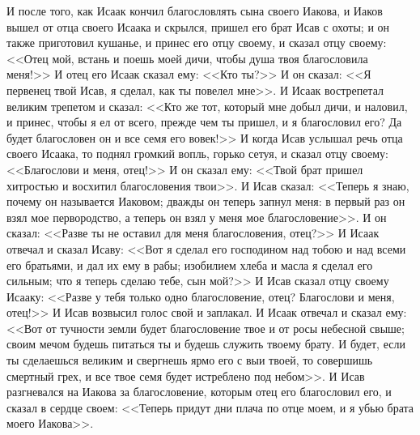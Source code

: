 И после того, как Исаак кончил благословлять
сына своего Иакова, и Иаков вышел от отца своего
Исаака и скрылся, пришел его брат Исав с охоты; и
он также приготовил кушанье, и принес его отцу
своему, и сказал отцу своему: <<Отец мой, встань
и поешь моей дичи, чтобы душа твоя благословила
меня!>> И отец его Исаак сказал ему: <<Кто
ты?>> И он сказал: <<Я первенец твой Исав, я
сделал, как ты повелел мне>>. И Исаак
вострепетал великим трепетом и сказал: <<Кто же
тот, который мне добыл дичи, и наловил, и принес,
чтобы я ел от всего, прежде чем ты пришел, и я
благословил его? Да будет благословен он и все
семя его вовек!>> И когда Исав услышал речь отца
своего Исаака, то поднял громкий вопль, горько
сетуя, и сказал отцу своему: <<Благослови и меня,
отец!>> И он сказал ему: <<Твой брат пришел
хитростью и восхитил благословения твои>>. И
Исав сказал: <<Теперь я знаю, почему он
называется Иаковом; дважды он теперь запнул меня:
в первый раз он взял мое первородство, а теперь он
взял у меня мое благословение>>. И он сказал:
<<Разве ты не оставил для меня благословения,
отец?>> И Исаак отвечал и сказал Исаву: <<Вот я
сделал его господином над тобою и над всеми его
братьями, и дал их ему в рабы; изобилием хлеба и
масла я сделал его сильным; что я теперь сделаю
тебе, сын мой?>> И Исав сказал отцу своему
Исааку: <<Разве у тебя только одно
благословение, отец? Благослови и меня, отец!>> И
Исав возвысил голос свой и заплакал. И Исаак
отвечал и сказал ему: <<Вот от тучности земли
будет благословение твое и от росы небесной
свыше; своим мечом будешь питаться ты и будешь
служить твоему брату. И будет, если ты сделаешься
великим и свергнешь ярмо его с выи твоей, то
совершишь смертный грех, и все твое семя будет
истреблено под небом>>. И Исав разгневался на
Иакова за благословение, которым отец его
благословил его, и сказал в сердце своем:
<<Теперь придут дни плача по отце моем, и я убью
брата моего Иакова>>.

